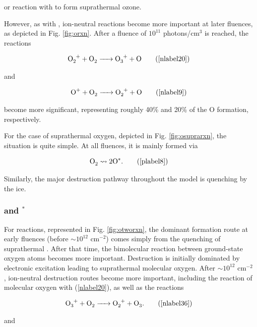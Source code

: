 \documentclass[journal=aesccq,manuscript=article,layout=twocolumn]{achemso}
\begin{document}
\noindent
or reaction with  to form suprathermal ozone.

However, as with , ion-neutral reactions become more important at later fluences, as depicted in Fig. \ref{fig:orxn}. After a fluence of $10^{11}$ photons/cm$^{3}$ is reached, the reactions

\begin{equation}
    \ce{O2+ + O2 -> O3+ + O}
    \tag{\ref{nlabel20}}
    \label{otwoiondest}
\end{equation}

\noindent
and

\begin{equation}
    \ce{O+ + O2 -> O2+ + O}
    \tag{\ref{nlabel9}}
\end{equation}

\noindent
become more significant, representing roughly 40\% and 20\% of the O formation, respectively. 

For the case of suprathermal oxygen, depicted in Fig. \ref{fig:osuprarxn}, the situation is quite simple. At all fluences, it is mainly formed via 

\begin{equation}
    \ce{O2} \leadsto 2\ce{O}^*.
    \tag{\ref{plabel8}}
\end{equation}

\noindent
Similarly, the major destruction pathway throughout the model is quenching by the ice.

\subsubsection{ and $^*$}

For  reactions, represented in Fig. \ref{fig:otworxn}, the dominant formation route at early fluences (before $\sim10^{12}$ cm$^{-2}$) comes simply from the quenching of suprathermal . After that time, the bimolecular reaction between ground-state oxygen atoms becomes more important. Destruction is initially dominated by electronic excitation leading to suprathermal molecular oxygen. After $\sim10^{12}$ cm$^{-2}$, ion-neutral destruction routes become more important, including the reaction of molecular oxygen with  (\ref{nlabel20}), as well as the reactions

\begin{equation}
    \ce{O3+ + O2 -> O2+ + O3}.
    \tag{\ref{nlabel36}}
\end{equation}

\noindent
and
\end{document}
